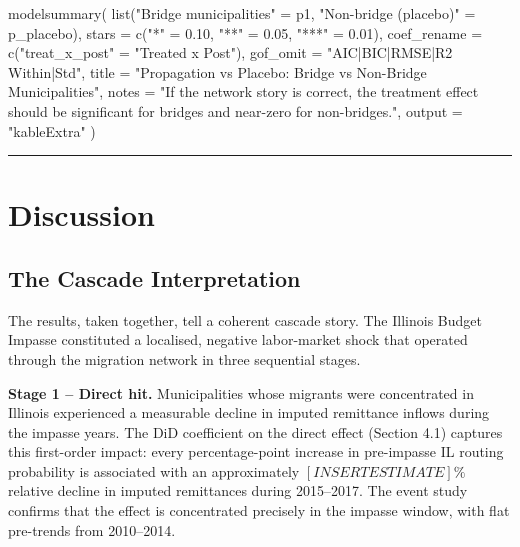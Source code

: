 \documentclass[
  11pt,
  letterpaper,
  DIV=11,
  numbers=noendperiod]{scrartcl}
\newenvironment{Shaded}{}{}
\newcommand{\AttributeTok}[1]{\textcolor[rgb]{0.84,0.23,0.29}{#1}}
\newcommand{\FloatTok}[1]{\textcolor[rgb]{0.00,0.36,0.77}{#1}}
\newcommand{\FunctionTok}[1]{\textcolor[rgb]{0.44,0.26,0.76}{#1}}
\newcommand{\NormalTok}[1]{\textcolor[rgb]{0.14,0.16,0.18}{#1}}
\newcommand{\OtherTok}[1]{\textcolor[rgb]{0.44,0.26,0.76}{#1}}
\newcommand{\StringTok}[1]{\textcolor[rgb]{0.01,0.18,0.38}{#1}}
\begin{document}
\begin{Shaded}
\begin{Highlighting}[]
\FunctionTok{modelsummary}\NormalTok{(}
  \FunctionTok{list}\NormalTok{(}\StringTok{"Bridge municipalities"} \OtherTok{=}\NormalTok{ p1,}
       \StringTok{"Non{-}bridge (placebo)"}  \OtherTok{=}\NormalTok{ p\_placebo),}
  \AttributeTok{stars      =} \FunctionTok{c}\NormalTok{(}\StringTok{"*"} \OtherTok{=} \FloatTok{0.10}\NormalTok{, }\StringTok{"**"} \OtherTok{=} \FloatTok{0.05}\NormalTok{, }\StringTok{"***"} \OtherTok{=} \FloatTok{0.01}\NormalTok{),}
  \AttributeTok{coef\_rename =} \FunctionTok{c}\NormalTok{(}\StringTok{"treat\_x\_post"} \OtherTok{=} \StringTok{"Treated x Post"}\NormalTok{),}
  \AttributeTok{gof\_omit   =} \StringTok{"AIC|BIC|RMSE|R2 Within|Std"}\NormalTok{,}
  \AttributeTok{title      =} \StringTok{"Propagation vs Placebo: Bridge vs Non{-}Bridge Municipalities"}\NormalTok{,}
  \AttributeTok{notes      =} \StringTok{"If the network story is correct, the treatment effect should be significant for bridges and near{-}zero for non{-}bridges."}\NormalTok{,}
  \AttributeTok{output     =} \StringTok{"kableExtra"}
\NormalTok{)}
\end{Highlighting}
\end{Shaded}

\begin{center}\rule{0.5\linewidth}{0.5pt}\end{center}

\section{Discussion}\label{discussion}

\subsection{The Cascade
Interpretation}\label{the-cascade-interpretation}

The results, taken together, tell a coherent cascade story. The Illinois
Budget Impasse constituted a localised, negative labor-market shock that
operated through the migration network in three sequential stages.

\textbf{Stage 1 -- Direct hit.} Municipalities whose migrants were
concentrated in Illinois experienced a measurable decline in imputed
remittance inflows during the impasse years. The DiD coefficient on the
direct effect (Section 4.1) captures this first-order impact: every
percentage-point increase in pre-impasse IL routing probability is
associated with an approximately \([INSERT ESTIMATE]\%\) relative
decline in imputed remittances during 2015--2017. The event study
confirms that the effect is concentrated precisely in the impasse
window, with flat pre-trends from 2010--2014.
\end{document}
